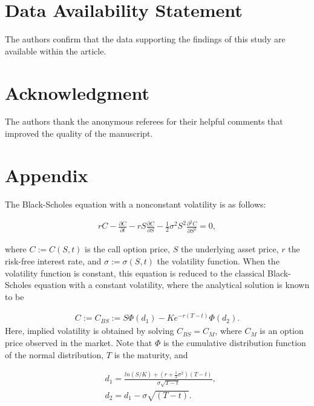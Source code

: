 \documentclass{article}
\begin{document}
\bigskip

\section*{Data Availability Statement}
The authors confirm that the data supporting the findings of this study are available within the article.

\section*{Acknowledgment}
The authors thank the anonymous referees for their helpful comments that improved the quality of the manuscript.
\typeout{}

 


\section*{Appendix}
{
The Black-Scholes equation with a nonconstant volatility is as follows: 

\begin{equation} \label{e:bse}
\begin{split}
     rC - \frac{\partial{C}}{\partial{t}} - rS\frac{\partial{C}}{\partial{S}} - \frac{1}{2}\sigma^2S^2\frac{\partial{^2C}}{\partial{S^2}} = 0,
\end{split}
\end{equation}

where $C:= C(S, t)$ is the call option price, $S$ the underlying asset price, $r$ the risk-free interest rate, and $\sigma:= \sigma(S, t)$ the volatility function. When the volatility function is constant, this equation is reduced to the classical Black-Scholes equation with a constant volatility, where the analytical solution is known to be

\begin{equation} 
\begin{split}
    C:= C_{BS} := S\Phi(d_{1}) - Ke^{-r(T-t)}\Phi(d_{2}).
\end{split} \label{e:bssol}
\end{equation}
Here, implied volatility is obtained by solving $C_{BS} = C_M$, where $C_M$ is an option price observed in the market.  
Note that $\Phi$ is the cumulative distribution function of the normal distribution, $T$ is the maturity, and

\begin{equation} 
\begin{split}
    & d_{1} = \frac{ln(S/K) + (r + \frac{1}{2}\sigma^2)(T-t)}{\sigma\sqrt{T - t}},\\ 
    & d_{2} = d_{1} - \sigma\sqrt{(T-t)}.
\end{split} \label{e:bssol2}
\end{equation}
}
\end{document}
